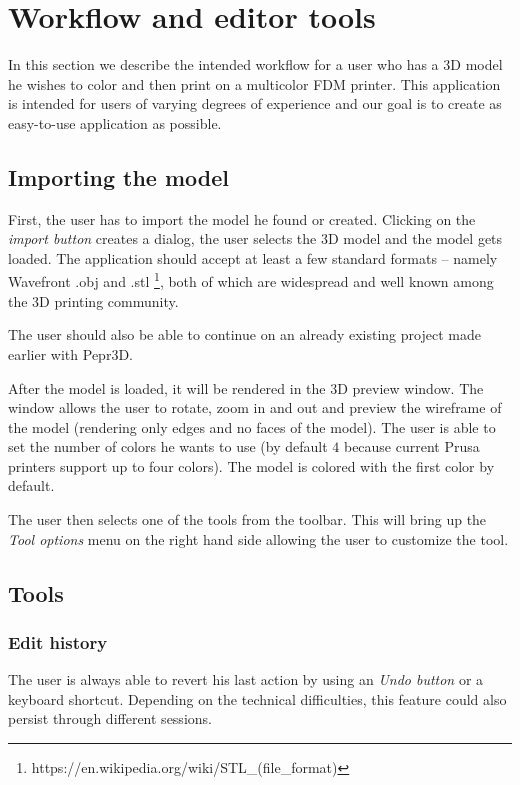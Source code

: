 \section{Workflow and editor tools}

In this section we describe the intended workflow for a user who has a 3D model he wishes to color and then print on a multicolor FDM printer. This application is intended for users of varying degrees of experience and our goal is to create as easy-to-use application as possible.

\subsection{Importing the model}

First, the user has to import the model he found or created. Clicking on the \textit{import button} creates a dialog, the user selects the 3D model and the model gets loaded. The application should accept at least a few standard formats -- namely Wavefront $.$obj and $.$stl \footnote{https://en.wikipedia.org/wiki/STL\_(file\_format)}, both of which are widespread and well known among the 3D printing community.

The user should also be able to continue on an already existing project made earlier with Pepr3D.

After the model is loaded, it will be rendered in the 3D preview window. The window allows the user to rotate, zoom in and out and preview the wireframe of the model (rendering only edges and no faces of the model). The user is able to set the number of colors he wants to use (by default $4$ because current Prusa printers support up to four colors). The model is colored with the first color by default.

The user then selects one of the tools from the toolbar. This will bring up the \textit{Tool options} menu on the right hand side allowing the user to customize the tool.

\subsection{Tools}

\subsubsection{Edit history}
The user is always able to revert his last action by using an \textit{Undo button} or a keyboard shortcut. Depending on the technical difficulties, this feature could also persist through different sessions.

